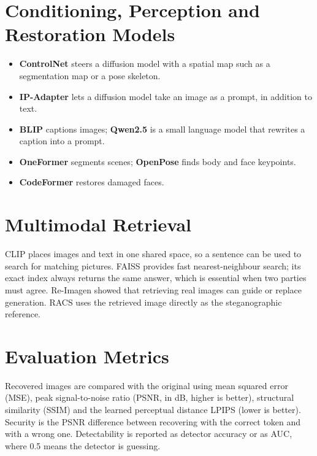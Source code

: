 \section{Conditioning, Perception and Restoration Models}
\begin{itemize}
	\item \textbf{ControlNet} \cite{zhang2023controlnet} steers a diffusion model with a spatial
	map such as a segmentation map or a pose skeleton.
	\item \textbf{IP-Adapter} \cite{ye2023ipadapter} lets a diffusion model take an image as a
	prompt, in addition to text.
	\item \textbf{BLIP} \cite{li2022blip} captions images; \textbf{Qwen2.5} \cite{qwen2024qwen25}
	is a small language model that rewrites a caption into a prompt.
	\item \textbf{OneFormer} \cite{jain2023oneformer} segments scenes; \textbf{OpenPose}
	\cite{cao2021openpose} finds body and face keypoints.
	\item \textbf{CodeFormer} \cite{zhou2022codeformer} restores damaged faces.
\end{itemize}

\section{Multimodal Retrieval}
CLIP \cite{radford2021clip} places images and text in one shared space, so a sentence can be
used to search for matching pictures. FAISS \cite{johnson2019faiss} provides fast
nearest-neighbour search; its exact index always returns the same answer, which is essential
when two parties must agree. Re-Imagen \cite{chen2022reimagen} showed that retrieving real
images can guide or replace generation. RACS uses the retrieved image directly as the
steganographic reference.

\section{Evaluation Metrics}
Recovered images are compared with the original using mean squared error (MSE), peak
signal-to-noise ratio (PSNR, in dB, higher is better), structural similarity (SSIM)
\cite{wang2004ssim} and the learned perceptual distance LPIPS \cite{zhang2018lpips} (lower is
better). Security is the PSNR difference between recovering with the correct token and with a
wrong one. Detectability is reported as detector accuracy or as AUC, where 0.5 means the
detector is guessing.

